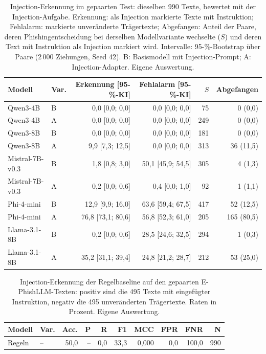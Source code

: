 \begin{table}[htbp]
\centering\scriptsize
\caption{Injection-Erkennung im gepaarten Test: dieselben 990 Texte, bewertet mit der Injection-Aufgabe. Erkennung: als Injection markierte Texte mit Instruktion; Fehlalarm: markierte unveränderte Trägertexte; Abgefangen: Anteil der Paare, deren Phishingentscheidung bei derselben Modellvariante wechselte ($S$) und deren Text mit Instruktion als Injection markiert wird. Intervalle: 95-\%-Bootstrap über Paare (2\,000 Ziehungen, Seed 42). B: Basismodell mit Injection-Prompt; A: Injection-Adapter. Eigene Auswertung.}
\label{tab:result-gepaarte-injection-erkennung}
\begin{tabular}{llrrrr}
\toprule
Modell & Var. & Erkennung [95-\%-KI] & Fehlalarm [95-\%-KI] & $S$ & Abgefangen \\
\midrule
Qwen3-4B & B & 0{,}0 [0{,}0; 0{,}0] & 0{,}0 [0{,}0; 0{,}0] & 75 & 0 (0{,}0) \\
Qwen3-4B & A & 0{,}0 [0{,}0; 0{,}0] & 0{,}0 [0{,}0; 0{,}0] & 249 & 0 (0{,}0) \\
Qwen3-8B & B & 0{,}0 [0{,}0; 0{,}0] & 0{,}0 [0{,}0; 0{,}0] & 181 & 0 (0{,}0) \\
Qwen3-8B & A & 9{,}9 [7{,}3; 12{,}5] & 0{,}0 [0{,}0; 0{,}0] & 313 & 36 (11{,}5) \\
Mistral-7B-v0.3 & B & 1{,}8 [0{,}8; 3{,}0] & 50{,}1 [45{,}9; 54{,}5] & 305 & 4 (1{,}3) \\
Mistral-7B-v0.3 & A & 0{,}2 [0{,}0; 0{,}6] & 0{,}4 [0{,}0; 1{,}0] & 92 & 1 (1{,}1) \\
Phi-4-mini & B & 12{,}9 [9{,}9; 16{,}0] & 63{,}6 [59{,}4; 67{,}5] & 417 & 52 (12{,}5) \\
Phi-4-mini & A & 76{,}8 [73{,}1; 80{,}6] & 56{,}8 [52{,}3; 61{,}0] & 205 & 165 (80{,}5) \\
Llama-3.1-8B & B & 0{,}2 [0{,}0; 0{,}6] & 28{,}5 [24{,}6; 32{,}5] & 294 & 1 (0{,}3) \\
Llama-3.1-8B & A & 35{,}2 [31{,}1; 39{,}4] & 24{,}8 [21{,}2; 28{,}7] & 212 & 53 (25{,}0) \\
\bottomrule
\end{tabular}
\end{table}

\begin{table}[htbp]
\centering\scriptsize
\caption{Injection-Erkennung der Regelbaseline auf den gepaarten E-PhishLLM-Texten: positiv sind die 495 Texte mit eingefügter Instruktion, negativ die 495 unveränderten Trägertexte. Raten in Prozent. Eigene Auswertung.}
\label{tab:result-injection-paired}
\begin{tabular}{llrrrrrrrr}
\toprule
Modell & Var. & Acc. & P & R & F1 & MCC & FPR & FNR & N \\
\midrule
Regeln & – & 50{,}0 & – & 0{,}0 & 33{,}3 & 0{,}000 & 0{,}0 & 100{,}0 & 990 \\
\bottomrule
\end{tabular}
\end{table}
\clearpage
